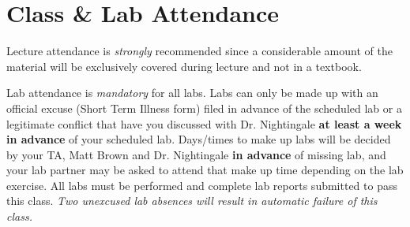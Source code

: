 \section{Class \& Lab Attendance}

Lecture attendance is \emph{strongly} recommended since a considerable amount
of the material will be exclusively covered during lecture and not in a textbook.


Lab attendance is \emph{mandatory} for all labs.  Labs can only be made up with
an official excuse (Short Term Illness form) filed in advance of the scheduled
lab or a legitimate conflict that have you discussed with Dr. Nightingale
\textbf{at least a week in advance} of your scheduled lab.  Days/times to make
up labs will be decided by your TA, Matt Brown and Dr. Nightingale \textbf{in
advance} of missing lab, and your lab partner may be asked to attend that make
up time depending on the lab exercise.  All labs must be performed and complete
lab reports submitted to pass this class.  \emph{Two unexcused lab absences will result
in automatic failure of this class.}
